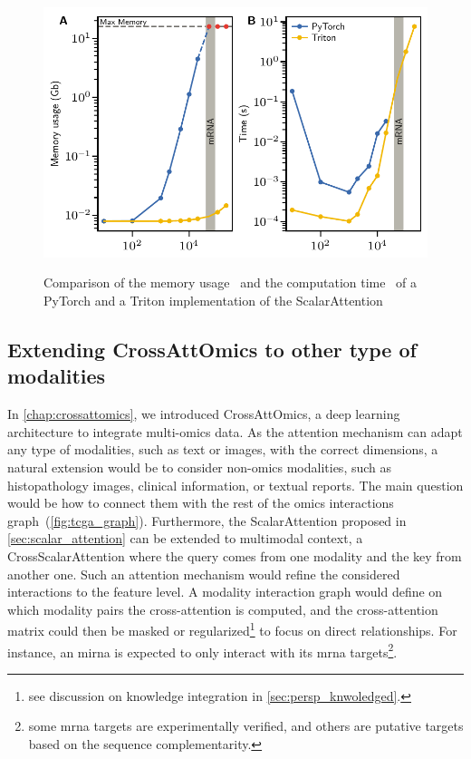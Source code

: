 \documentclass[../main.tex]{subfiles}
\begin{document}
		\begin{figure}[htbp]
			\centering
			\begin{subcaptiongroup}
				\includegraphics{ScalarAttentionBenchmark.pdf}
				\label{fig:lin_attention_benchA}
				\label{fig:lin_attention_benchB}
			\end{subcaptiongroup}
			\caption[Comparison of two ScalarAttention implementation]{Comparison of the memory usage~ and the computation time~ of a \textcolor[HTML]{3969AC}{PyTorch} and a \textcolor[HTML]{F2B701}{Triton} implementation of the ScalarAttention}
			\label{fig:lin_attention_bench}
		\end{figure}

	\subsection{Extending CrossAttOmics to other type of modalities}
		In \cref{chap:crossattomics}, we introduced CrossAttOmics, a deep learning architecture to integrate multi-omics data.
		As the attention mechanism can adapt any type of modalities, such as text or images, with the correct dimensions, a natural extension would be to consider non-omics modalities, such as histopathology images, clinical information, or textual reports.
		The main question would be how to connect them with the rest of the omics interactions graph~(\cref{fig:tcga_graph}).
		Furthermore, the ScalarAttention proposed in \cref{sec:scalar_attention} can be extended to multimodal context, \ie{}a CrossScalarAttention where the query comes from one modality and the key from another one.
		Such an attention mechanism would refine the considered interactions to the feature level.
		A modality interaction graph would define on which modality pairs the cross-attention is computed, and the cross-attention matrix could then be masked or regularized\footnote{see discussion on knowledge integration in \cref{sec:persp_knwoledged}.} to focus on direct relationships.
		For instance, an \gls{mirna} is expected to only interact with its \gls{mrna} targets\footnote{some \gls{mrna} targets are experimentally verified, and others are putative targets based on the sequence complementarity.}.
\end{document}
